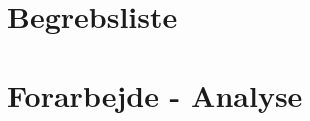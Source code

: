 
\usepackage[utf8]{inputenc}
\usepackage[table,xcdraw]{xcolor}
\usepackage{float}
\usepackage{graphicx}
\usepackage{placeins}
\TabPositions{4cm, 6cm, 8cm}




\frontmatter
\newpage


\listoftodos[Notes]

\chapter{Begrebsliste}

\cleardoublepage
\tableofcontents*
\mainmatter



\chapter{Forarbejde - Analyse}








\printbibliography

